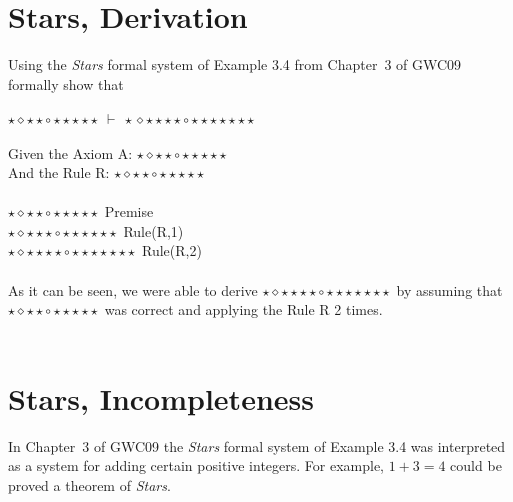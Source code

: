 \documentclass[11pt]{article}
\begin{document}
    \section{Stars, Derivation}
    Using the {\em Stars} formal system of Example 3.4 from Chapter~3 of GWC09 formally show that\\
    \\
    ${\star}{\diamond}{\star}{\star}{\circ}{\star}{\star}{\star}{\star}{\star}\ {\vdash}\ {\star}{\diamond}{\star}{\star}{\star}{\star}{\circ}{\star}{\star}{\star}{\star}{\star}{\star}{\star}$\\
    \\
    Given the Axiom A: ${\star}{\diamond}{\star}{\star}{\circ}{\star}{\star}{\star}{\star}{\star}$\\
    And the Rule R: ${\star}{\diamond}{\star}{\star}{\circ}{\star}{\star}{\star}{\star}{\star}$\\
    \\
    ${\star}{\diamond}{\star}{\star}{\circ}{\star}{\star}{\star}{\star}{\star}$ Premise \\
    ${\star}{\diamond}{\star}{\star}{\star}{\circ}{\star}{\star}{\star}{\star}{\star}{\star}$ Rule(R,1) \\
    ${\star}{\diamond}{\star}{\star}{\star}{\star}{\circ}{\star}{\star}{\star}{\star}{\star}{\star}{\star}$ Rule(R,2) \\
    \\
    As it can be seen, we were able to derive ${\star}{\diamond}{\star}{\star}{\star}{\star}{\circ}{\star}{\star}{\star}{\star}{\star}{\star}{\star}$
    by assuming that ${\star}{\diamond}{\star}{\star}{\circ}{\star}{\star}{\star}{\star}{\star}$ was correct and applying the Rule R 2 times. \\
    \\
    \section{Stars, Incompleteness}
    In Chapter~3 of GWC09 the {\em Stars} formal system of Example 3.4 was interpreted as a system for adding certain positive integers. For example, $1 + 3 = 4$ could be proved a theorem of {\em Stars}.
\end{document}
